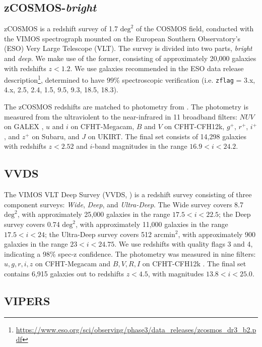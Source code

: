 \documentclass[twocolumn]{aastex63}
\begin{document}
    \medskip
    \subsection{zCOSMOS-\textit{bright}}

    zCOSMOS \citep{Lilly2009a} is a redshift survey of 1.7 $\text{deg}^2$ of the COSMOS field, conducted with the VIMOS spectrograph mounted on the European Southern Observatory's (ESO) Very Large Telescope (VLT).
    The survey is divided into two parts, \textit{bright} and \textit{deep}. 
    We make use of the former, consisting of approximately 20,000 galaxies with redshifts $z < 1.2$.
    We use galaxies recommended in the ESO data release description\footnote{\url{https://www.eso.org/sci/observing/phase3/data_releases/zcosmos_dr3_b2.pdf}}, determined to have $99\%$ spectroscopic verification (i.e. \texttt{zflag} = 3.x, 4.x, 2.5, 2.4, 1.5, 9.5, 9.3, 18.5, 18.3).

    The zCOSMOS redshifts are matched to photometry from \citet{Ilbert2009}.
    The photometry is measured from the ultraviolent to the near-infrared in 11 broadband filters: $NUV$ on GALEX \citep{Martin2005a}, $u$ and $i$ on CFHT-Megacam, $B$ and $V$ on CFHT-CFH12k, $g^+$, $r^+$, $i^+$, and $z^+$ on Subaru, and $J$ on UKIRT.
    The final set consists of 14,298 galaxies with redshifts $z < 2.52$ and $i$-band magnitudes in the range $16.9 < i < 24.2$.

    \subsection{VVDS}

    The VIMOS VLT Deep Survey (VVDS, \citealt{LeFevre2013b}) is a redshift survey consisting of three component surveys: \textit{Wide}, \textit{Deep}, and \textit{Ultra-Deep}. 
    The Wide survey covers 8.7 $\text{deg}^2$, with approximately 25,000 galaxies in the range $17.5 < i < 22.5$; the Deep survey covers 0.74 $\text{deg}^2$, with approximately 11,000 galaxies in the range $17.5 < i < 24$; the Ultra-Deep survey covers 512 $\text{arcmin}^2$, with approximately 900 galaxies in the range $23 < i < 24.75$.
    We use redshifts with quality flags 3 and 4, indicating a 98\% spec-z confidence.
    The photometry was measured in nine filters: $u,g,r,i,z$ on CFHT-Megacam \citep{Hudelot2012} and $B,V,R,I$ on CFHT-CFH12k \citep{LeFevre2004}.
    The final set contains 6,915 galaxies out to redshifts $z < 4.5$, with magnitudes $ 13.8 < i < 25.0$.

    \subsection{VIPERS}
\end{document}
